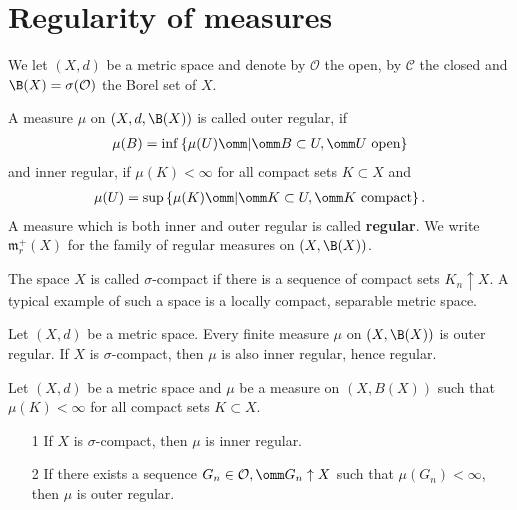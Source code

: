 
\section{Regularity of measures}

We let $(X,d)$ be a metric space and denote by $\mathcal O$ the open, by $\mathcal C$ the closed and $\B(X)=\sigma(\mathcal O)$ the Borel set of $X$.

\begin{definition}
    A measure $\mu$ on $(X,d,\B(X))$ is called outer regular, if \begin{align}
        \mu(B) = \inf\left\{\mu(U)\omm|\omm B\subset U,\omm U \text{ open} \right\}
    \end{align}
    and inner regular, if $\mu(K)<\infty$ for all compact sets $K\subset X$ and \begin{align}
        \mu(U) = \sup\left\{\mu(K)\omm|\omm K\subset U,\omm K \text{ compact} \right\}.
    \end{align}
    A measure which is both inner and outer regular is called \textbf{regular}. We write $\mathfrak m_r^+(X)$ for the family of 
    regular measures on $(X,\B(X))$.
\end{definition}

\begin{remark}
    The space $X$ is called $\sigma$-compact if there is a sequence of compact sets $K_n\uparrow X$. A typical example of such a space 
    is a locally compact, separable metric space.
\end{remark}

\begin{theorem}
    Let $(X,d)$ be a metric space. Every finite measure $\mu$ on $(X,\B(X))$ is outer regular. If $X$ is $\sigma$-compact, then $\mu$ is also inner regular, hence regular.
\end{theorem}
\begin{theorem}
    Let $(X,d)$ be a metric space and $\mu$ be a measure on $(X,B(X))$ such that $\mu(K)<\infty$ for all compact sets $K\subset X$.
\end{theorem}
\begin{itemize}
    \item[1] If $X$ is $\sigma$-compact, then $\mu$ is inner regular.
    \item[2] If there exists a sequence $G_n\in\mathcal O,\omm G_n\uparrow X$ such that $\mu(G_n)<\infty$, then $\mu$ is outer regular.   
\end{itemize}
